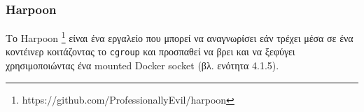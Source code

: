 \subsubsection{\textlatin{Harpoon}}

Το \textlatin{Harpoon}
\footnote{\textlatin{https://github.com/ProfessionallyEvil/harpoon}} είναι ένα
εργαλείο που μπορεί να αναγνωρίσει εάν τρέχει μέσα σε ένα κοντέινερ
κοιτάζοντας το \texttt{\textlatin{cgroup}} και προσπαθεί να βρει και να ξεφύγει
χρησιμοποιώντας ένα \textlatin{mounted Docker socket} (βλ. ενότητα 4.1.5).
